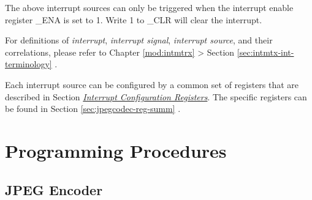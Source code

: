 \documentclass[main\_\_EN.tex]{subfiles}
\begin{document}
The above interrupt sources can only be triggered when the interrupt enable register \_ENA is set to 1. Write 1 to \_CLR will clear the interrupt.

\begin{tiplisting}
For definitions of \textit{interrupt}, \textit{interrupt signal}, \textit{interrupt source}, and their correlations, please refer to Chapter \ref{mod:intmtrx} \textit{} > Section \ref{sec:intmtx-int-terminology} \textit{}.
\end{tiplisting}

Each interrupt source can be configured by a common set of registers that are described in Section \hyperref[interrupt-config-registers]{\textit{Interrupt Configuration Registers}}. The specific registers can be found in Section \ref{sec:jpegcodec-reg-summ} \textit{}.




\section{Programming Procedures}
\label{sec:jpegcodec-prog-procedures}

\subsection{JPEG Encoder}
\label{sec:jpegcodec-enc-prog}
\end{document}
